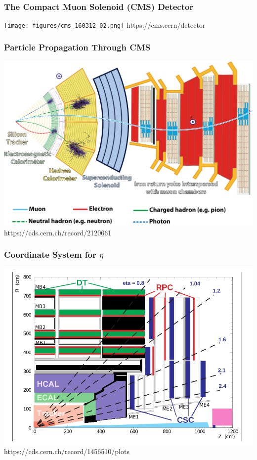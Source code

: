 \documentclass{beamer}
\begin{document}
\begin{frame}
  \frametitle{The Compact Muon Solenoid (CMS) Detector}

  \centering
  \texttt{[image: figures/cms\_160312\_02.png]}
  \tiny{https://cms.cern/detector}

\end{frame}

\begin{frame}
  \frametitle{Particle Propagation Through CMS}

  \centering
  \includegraphics[width=0.9\linewidth]{figures/CMSslice_whiteBackground.png}
  \tiny{https://cds.cern.ch/record/2120661}

\end{frame}

\begin{frame}
  \frametitle{Coordinate System for $\eta$}

  \centering
  \includegraphics[width=0.8\linewidth]{figures/pictures_MuonSys-mod3.png}
  \tiny{https://cds.cern.ch/record/1456510/plots}

\end{frame}
\end{document}

